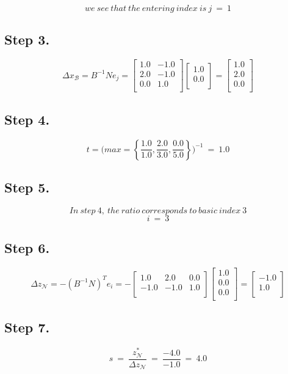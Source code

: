 \[
we\ see\ that\ the\ entering\ index\ is\  j\ =\ 1
\]
\subsection{Step 3.}
\[
\Delta x_{\mathcal B} = B^{-1} N e_j =
\begin{bmatrix}
1.0 & -1.0 \\ 2.0 & -1.0 \\ 0.0 & 1.0 \\ 
\end{bmatrix}
\begin{bmatrix}
1.0 \\ 0.0 \\ 
\end{bmatrix}
= \begin{bmatrix}
1.0 \\ 2.0 \\ 0.0 \\ 
\end{bmatrix}
\]
\subsection{Step 4.}
\[
t =\Bigg(
max= \left\{\frac{1.0}{1.0},\frac{2.0}{3.0},\frac{0.0}{5.0}\right\}
\Bigg)^{-1}\ =\ 1.0
\]
\subsection{Step 5.}
\[
In\ step\ 4, \ the\ ratio\ corresponds\ to\ basic\ index\ 3
\]
\[
i\ = \ 3
\]
\subsection{Step 6.}
\[
\Delta z_{\mathcal N}= -( B^{-1} N )^{T}e_i = -\begin{bmatrix}
1.0 & 2.0 & 0.0 \\ -1.0 & -1.0 & 1.0 \\ 
\end{bmatrix}
\begin{bmatrix}
1.0 \\ 0.0 \\ 0.0 \\ 
\end{bmatrix}
= \begin{bmatrix}
-1.0 \\ 1.0 \\ 
\end{bmatrix}
\]
\subsection{Step 7.}
\[
s \ =\ \frac{z_{\mathcal N}^{*}}{ \Delta z_{\mathcal N}}\ =\ \frac{-4.0}{-1.0}\ =\ 4.0
\]
